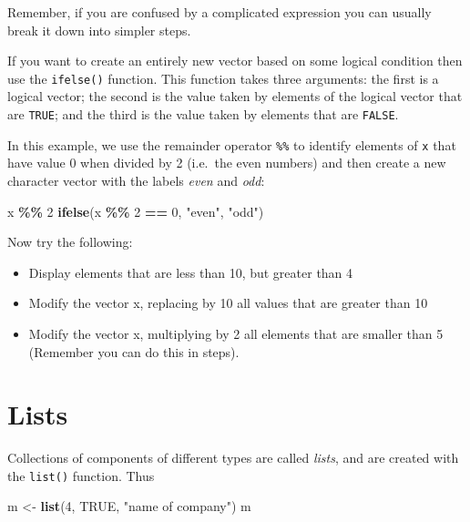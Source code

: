 \documentclass[
]{book}
\newenvironment{Shaded}{\begin{snugshade}}{\end{snugshade}}
\newcommand{\ConstantTok}[1]{\textcolor[rgb]{0.56,0.35,0.01}{#1}}
\newcommand{\DecValTok}[1]{\textcolor[rgb]{0.00,0.00,0.81}{#1}}
\newcommand{\FunctionTok}[1]{\textcolor[rgb]{0.13,0.29,0.53}{\textbf{#1}}}
\newcommand{\NormalTok}[1]{#1}
\newcommand{\OtherTok}[1]{\textcolor[rgb]{0.56,0.35,0.01}{#1}}
\newcommand{\SpecialCharTok}[1]{\textcolor[rgb]{0.81,0.36,0.00}{\textbf{#1}}}
\newcommand{\StringTok}[1]{\textcolor[rgb]{0.31,0.60,0.02}{#1}}
\providecommand{\tightlist}{%
  \setlength{\itemsep}{0pt}\setlength{\parskip}{0pt}}
\begin{document}
Remember, if you are confused by a complicated expression you can usually
break it down into simpler steps.

If you want to create an entirely new vector based on some logical
condition then use the \texttt{ifelse()} function. This function takes
three arguments: the first is a logical vector; the second is the
value taken by elements of the logical vector that are \texttt{TRUE}; and
the third is the value taken by elements that are \texttt{FALSE}.

In this example, we use the remainder operator \texttt{\%\%} to identify
elements of \texttt{x} that have value 0 when divided by 2 (i.e.~the even numbers)
and then create a new character vector with the labels \emph{even} and \emph{odd}:

\begin{Shaded}
\begin{Highlighting}[]
\NormalTok{x }\SpecialCharTok{\%\%} \DecValTok{2}
\FunctionTok{ifelse}\NormalTok{(x }\SpecialCharTok{\%\%} \DecValTok{2} \SpecialCharTok{==} \DecValTok{0}\NormalTok{, }\StringTok{"even"}\NormalTok{, }\StringTok{"odd"}\NormalTok{)}
\end{Highlighting}
\end{Shaded}

Now try the following:

\begin{itemize}
\tightlist
\item
  Display elements that are less than 10, but greater than 4
\item
  Modify the vector x, replacing by 10 all values that are greater than 10
\item
  Modify the vector x, multiplying by 2 all elements that are smaller than 5 (Remember you can do this in steps).
\end{itemize}

\section{Lists}\label{lists}

Collections of components of different types are called \emph{lists},
and are created with the \texttt{list()} function. Thus

\begin{Shaded}
\begin{Highlighting}[]
\NormalTok{m }\OtherTok{\textless{}{-}} \FunctionTok{list}\NormalTok{(}\DecValTok{4}\NormalTok{, }\ConstantTok{TRUE}\NormalTok{, }\StringTok{"name of company"}\NormalTok{)}
\NormalTok{m}
\end{Highlighting}
\end{Shaded}
\end{document}
